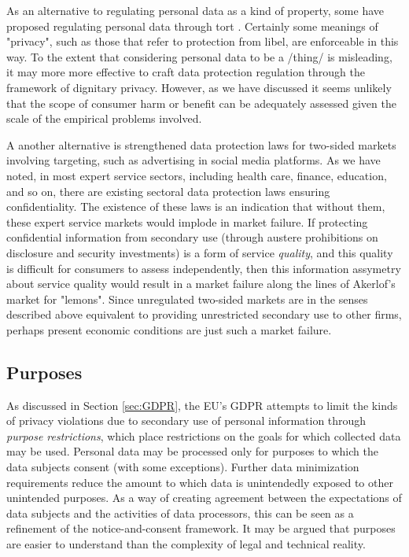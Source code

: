 \documentclass[../thesis.tex]{subfiles}
\begin{document}
As an alternative to regulating personal data as a kind of property,
some have proposed regulating personal data through tort
\cite{posner1981economics, cofone2017dynamic}.
Certainly some meanings of "privacy", such as those that refer
to protection from libel, are enforceable in this way.
To the extent that considering personal data to be a /thing/
is misleading, it may more more
effective to craft data protection regulation through
the framework of dignitary privacy. \cite{post2017data}
However, as we have discussed it seems unlikely that the scope
of consumer harm or benefit can be adequately assessed given the
scale of the empirical problems involved.

A another alternative is strengthened
data protection laws for two-sided markets involving targeting,
such as advertising in social media platforms.
As we have noted, in most expert service sectors, including
health care, finance, education, and so on, there are existing
sectoral data protection laws ensuring confidentiality.
The existence of these laws is an indication that without
them, these expert service markets would implode in market failure.
If protecting confidential information from secondary use
(through austere prohibitions on disclosure and security
investments) is a form of service \emph{quality}, and this quality
is difficult for consumers to assess independently, then
this information assymetry about service quality would result
in a market failure along the lines of Akerlof's market for
"lemons". \cite{akerlof1970market}
Since unregulated two-sided markets are in the senses described
above equivalent to providing unrestricted secondary use to
other firms, perhaps present economic conditions are just such
a market failure.

\subsection{Purposes}

As discussed in Section \ref{sec:GDPR},
the EU's GDPR attempts to limit the kinds of privacy
violations due to secondary use of personal information
through \emph{purpose restrictions},
which place restrictions on the goals for which collected
data may be used.
Personal data may be processed only for purposes to which
the data subjects consent (with some exceptions).
Further data minimization requirements reduce the amount
to which data is unintendedly exposed to other unintended purposes.
As a way of creating agreement between the expectations of data
subjects and the activities of data processors, this can be
seen as a refinement of the notice-and-consent framework.
It may be argued that purposes are easier to understand
than the complexity of legal and technical reality.
\end{document}

